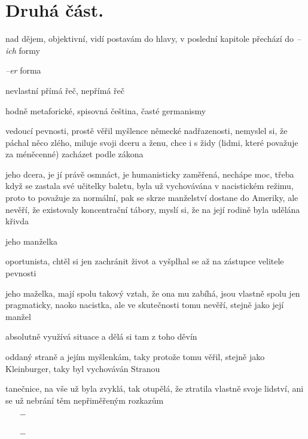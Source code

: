 \documentclass{article}
\begin{document}
\section{Druhá část.}
\begin{description}
    \setlength\itemsep{0.15em}
    \item[vypravěč:] nad dějem, objektivní, vidí postavám do hlavy, v poslední kapitole přechází do \textit{--ich} formy
    \item[vyprávěcí způsoby:] \textit{--er} forma
    \item[typy promluv:] nevlastní přímá řeč, nepřímá řeč
    \item[jazyková stránka:] hodně metaforické, spisovná čeština, časté germanismy
    \item[postavy:]
        \begin{description}
            \setlength\itemsep{0.15em}
            \item[Karel Kleinburger,] vedoucí pevnosti, prostě věřil myšlence německé nadřazenosti, nemyslel si, že páchal něco zlého, miluje svoji dceru a ženu, chce i s židy (lidmi, které považuje za méněcenné) zacházet podle zákona
            \item[Kristina,] jeho dcera, je jí právě osmnáct, je humanisticky zaměřená, nechápe moc, třeba když se zastala své učitelky baletu, byla už vychovávána v nacistickém režimu, proto to považuje za normální, pak se skrze manželství dostane do Ameriky, ale nevěří, že existovaly koncentrační tábory, myslí si, že na její rodině byla udělána křivda
            \item[Gertruda,] jeho manželka
            \item[Grube,] oportunista, chtěl si jen zachránit život a vyšplhal se až na zástupce velitele pevnosti
            \item[Monika Grubeová,] jeho maželka, mají spolu takový vztah, že ona mu zabíhá, jsou vlastně spolu jen pragmaticky, naoko nacistka, ale ve skutečnosti tomu nevěří, stejně jako její manžel
            \item[Kolatschek,] absolutně využívá situace a dělá si tam z toho děvín
            \item[Weismüller,] oddaný straně a jejím myšlenkám, taky protože tomu věřil, stejně jako Kleinburger, taky byl vychováván Stranou
            \item[Anna,] tanečnice, na vše už byla zvyklá, tak otupělá, že ztratila vlastně svoje lidství, ani se už nebrání těm nepřiměřeným rozkazům
        \end{description}
    \item[názor:]
    \item[kontext:]  \vspace{-0.5em}
        \setlength\itemsep{0em}
        \begin{itemize}
            \item[$-$]
        \end{itemize}
    \item[zdroje:] $ $
    \begin{itemize}
        \setlength\itemsep{0em}
        \item[$-$]
    \end{itemize}
\end{description}
\end{document}
